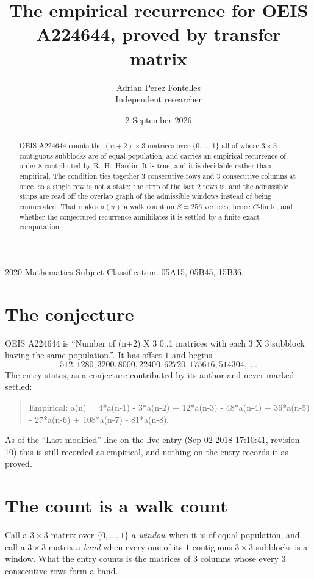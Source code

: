 \documentclass[11pt,a4paper]{article}
\title{The empirical recurrence for OEIS A224644, proved by transfer matrix}
\author{Adrian Perez Fontelles\\ \small Independent researcher}
\date{2 September 2026}
\theoremstyle{plain}
\theoremstyle{definition}
\begin{document}
\maketitle

\begin{abstract}
OEIS A224644 counts the $(n+2)\times3$ matrices over $\{0,\dots,1\}$ all of whose
$3\times3$ contiguous subblocks are of equal population, and carries an empirical recurrence of order
$8$ contributed by R.~H.~Hardin. It is true, and it is decidable rather than empirical.
The condition ties together $3$ consecutive rows and $3$ consecutive columns at once, so a
single row is not a state; the strip of the last $2$ rows is, and the admissible strips
are read off the overlap graph of the admissible windows instead of being enumerated. That
makes $a(n)$ a walk count on $S=256$ vertices, hence $C$-finite, and whether the conjectured
recurrence annihilates it is settled by a finite exact computation.
\end{abstract}

\noindent\small 2020 Mathematics Subject Classification. 05A15, 05B45, 15B36.\normalsize

\section{The conjecture}

OEIS A224644 is ``Number of (n+2) X 3 0..1 matrices with each 3 X 3 subblock having the same population.''. It has offset $1$ and begins
\[
512, 1280, 3200, 8000, 22400, 62720, 175616, 514304,\ \dots
\]
The entry states, as a conjecture contributed by its author and never marked settled:
\begin{quote}
Empirical: a(n) = 4*a(n-1) - 3*a(n-2) + 12*a(n-3) - 48*a(n-4) + 36*a(n-5) - 27*a(n-6) + 108*a(n-7) - 81*a(n-8).
\end{quote}
As of the ``Last modified'' line on the live entry (Sep 02 2018 17:10:41, revision 10) this is still
recorded as empirical, and nothing on the entry records it as proved.

\section{The count is a walk count}

Call a $3\times3$ matrix over $\{0,\dots,1\}$ a \emph{window} when it is of equal population, and
call a $3\times3$ matrix a \emph{band} when every one of its $1$ contiguous
$3\times3$ subblocks is a window. What the entry counts is the matrices of $3$ columns
whose every $3$ consecutive rows form a band.
\end{document}
